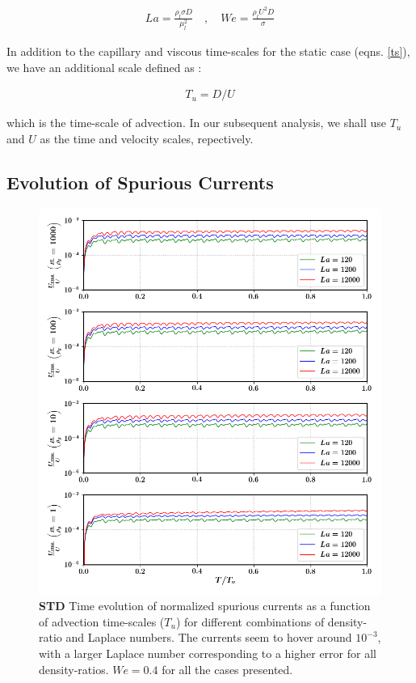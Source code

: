 \begin{align}
        La = \frac{\rho_l \sigma D}{\mu_l^2} \quad , \quad We = \frac{\rho_l U^2 D}{\sigma}
\end{align}

In addition to the capillary and viscous time-scales for the static case (eqns. \ref{ts}), we have an additional scale defined as :

\begin{align}
	T_{u} = D/U
\end{align}

which is the time-scale of advection. In our subsequent analysis, we shall use $T_u$ and $U$ as the time and velocity scales, repectively.

\subsection*{Evolution of Spurious Currents}

\begin{figure}[h!]
    \centering
    \includegraphics[]{plots/droplet_advect/evo_nonmc.png}
	\caption{\textbf{STD} Time evolution of normalized spurious currents as a function of advection time-scales ($T_u$) for different combinations of density-ratio and Laplace numbers. The currents seem to hover around $10^{-3}$, with a larger Laplace number corresponding to a higher error for all density-ratios. $We = 0.4$ for all the cases presented.}   
    \label{evo_nonmc}
\end{figure}

